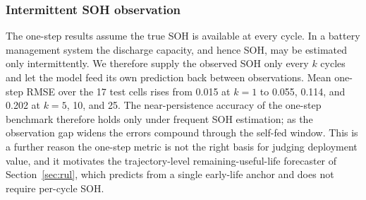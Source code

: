 \subsubsection{Intermittent SOH observation}\label{sec:intermittent}
The one-step results assume the true SOH is available at every cycle. In a battery
management system the discharge capacity, and hence SOH, may be estimated only
intermittently. We therefore supply the observed SOH only every $k$ cycles and let
the model feed its own prediction back between observations. Mean one-step RMSE over
the 17 test cells rises from 0.015 at $k=1$ to 0.055, 0.114, and 0.202 at $k=5$, 10,
and 25. The near-persistence accuracy of the one-step benchmark therefore holds only
under frequent SOH estimation; as the observation gap widens the errors compound
through the self-fed window. This is a further reason the one-step metric is not the
right basis for judging deployment value, and it motivates the trajectory-level
remaining-useful-life forecaster of Section~\ref{sec:rul}, which predicts from a
single early-life anchor and does not require per-cycle SOH.
